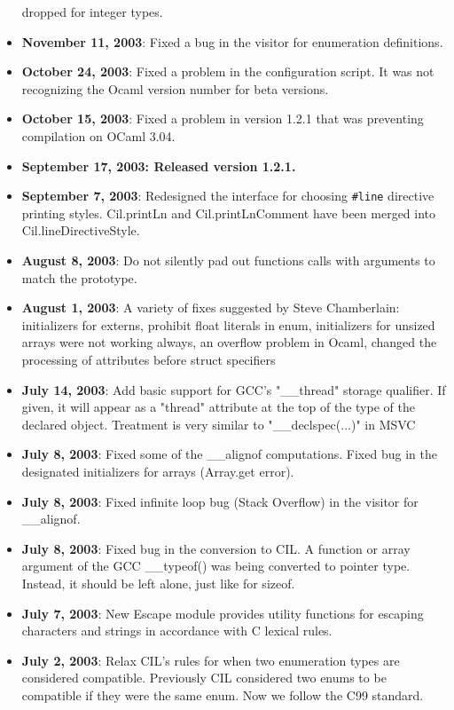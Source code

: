 \documentclass{article}
\begin{document}
\begin{itemize}
  dropped for integer types. 
\item {\bf November 11, 2003}: Fixed a bug in the visitor for enumeration
  definitions. 
\item {\bf October 24, 2003}: Fixed a problem in the configuration script. It
  was not recognizing the Ocaml version number for beta versions. 
\item {\bf October 15, 2003}: Fixed a problem in version 1.2.1 that was
  preventing compilation on OCaml 3.04.
\item {\bf September 17, 2003: Released version 1.2.1.}
\item {\bf September 7, 2003}: Redesigned the interface for choosing
  \texttt{\#line} directive printing styles.  Cil.printLn and
  Cil.printLnComment have been merged into Cil.lineDirectiveStyle.
\item {\bf August 8, 2003}: Do not silently pad out functions calls with
arguments to match the prototype. 
\item {\bf August 1, 2003}: A variety of fixes suggested by Steve Chamberlain:
initializers for externs, prohibit float literals in enum, initializers for
unsized arrays were not working always, an overflow problem in Ocaml, changed
the processing of attributes before struct specifiers

\item {\bf July 14, 2003}: Add basic support for GCC's "\_\_thread" storage
qualifier. If given, it will appear as a "thread" attribute at the top of the
type of the declared object. Treatment is very similar to "\_\_declspec(...)"
in MSVC

\item {\bf July 8, 2003}: Fixed some of the \_\_alignof computations. Fixed
  bug in the designated initializers for arrays (Array.get error).
\item {\bf July 8, 2003}: Fixed infinite loop bug (Stack Overflow) in the
  visitor for \_\_alignof.
\item {\bf July 8, 2003}: Fixed bug in the conversion to CIL. A function or
  array argument of
  the GCC \_\_typeof() was being converted to pointer type. Instead, it should
  be left alone, just like for sizeof.  
\item {\bf July 7, 2003}: New Escape module provides utility functions
  for escaping characters and strings in accordance with C lexical
  rules.

\item {\bf July 2, 2003}: Relax CIL's rules for when two enumeration types are
considered compatible. Previously CIL considered two enums to be compatible if
they were the same enum. Now we follow the C99 standard.



\end{itemize}
\end{document}
